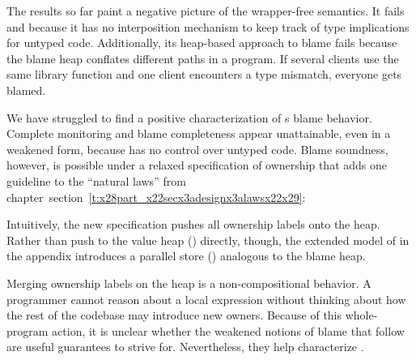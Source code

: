 \documentclass[ twoside,open=right,titlepage,numbers=noenddot,headinclude,%
                footinclude=true,cleardoublepage=empty,abstract=off,
                BCOR=5mm,paper=a4,fontsize=11pt,%
                ngerman,american,%
                parts,pdfspacing]{scrreprt}
\newcommand{\SecRef}[2]{section~#1}
\newcommand{\SecRefLocal}[3]{\hyperref[#1]{\SecRef{#2}{#3}}}
\renewcommand{\SecRefLocal}[3]{section~\ref{#1}}
\begin{document}
The results so far paint a negative picture of the wrapper{-}free \relax{\tname} semantics.
It fails \relax{$\propcm{}$} and  \relax{$\propbcpath{}$} because it has no interposition mechanism to
 keep track of type implications for untyped code.
Additionally, its heap{-}based approach to blame fails \relax{$\propbspath{}$} because the
 blame heap conflates different paths in a program.
If several clients use the same library function and one client encounters
 a type mismatch, everyone gets blamed.

We have struggled to find a positive characterization of s blame behavior.
Complete monitoring and blame completeness appear unattainable, even in a
 weakened form, because \relax{\tname} has no control over untyped code.
Blame soundness, however, is possible under a relaxed specification of ownership
 that adds one guideline to the {``}natural laws{''} from chapter~\SecRefLocal{t:x28part_x22secx3adesignx3alawsx22x29}{4.4.4.1}{How to lift a reduction relation}:


\noindent{}Intuitively, the new specification pushes all ownership labels onto the heap.
Rather than push to the value heap (\relax{$\vstore$}) directly, though, the
 extended model of \relax{\tname} in the appendix introduces a parallel store
 (\relax{$\lstore$}) analogous to the blame heap.

Merging ownership labels on the heap is a non{-}compositional behavior.
A programmer cannot reason about a local expression without thinking about
 how the rest of the codebase may introduce new owners.
Because of this whole{-}program action, it is unclear whether the weakened
 notions of blame that follow are useful guarantees to strive for.
Nevertheless, they help characterize \relax{\tname}.
\end{document}
